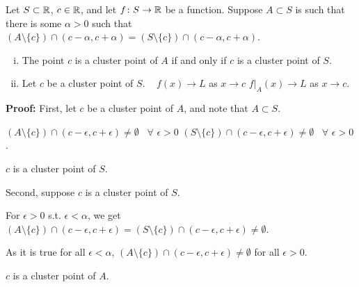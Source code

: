 \documentclass[10pt,aspectratio=169]{beamer}
\begin{document}
\begin{frame}

\begin{proposition}
Let $S \subset {\mathbb{R}}$, $c \in {\mathbb{R}}$, and
let $f \colon S
\to {\mathbb{R}}$ be a function.
\pause
Suppose
$A \subset S$ is such that there is some $\alpha > 0$ such that
$(A \setminus \{ c \}) \cap (c-\alpha,c+\alpha) = (S \setminus \{ c \}) \cap (c-\alpha,c+\alpha)$.
\pause
\begin{enumerate}[(i)]
\item
The point $c$ is a cluster point of $A$ if and only if $c$ is a cluster point
of $S$.
\item\pause
Let $c$ be a cluster point of $S$. ~ $f(x) \to L$ as $x \to c$
\wiffif
$f|_A(x) \to L$ as $x \to c$.
\end{enumerate}
\end{proposition}

\pause
\textbf{Proof:}
First, let $c$ be a cluster point of $A$, and note that $A \subset S$.

\pause
$( A \setminus \{ c\} ) \cap (c-\epsilon,c+\epsilon) \not= \emptyset$
~$\forall$ $\epsilon > 0$
\pause
\wthus
$( S \setminus \{ c\} ) \cap
(c-\epsilon,c+\epsilon) \not= \emptyset$
~$\forall$ $\epsilon > 0$.

\pause
\thus \quad $c$ is a cluster point of $S$.

\pause
\medskip

Second, suppose $c$ is a cluster point of $S$.

\pause
For $\epsilon > 0$ s.t.  $\epsilon < \alpha$, we get $( A \setminus \{ c\} ) \cap (c-\epsilon,c+\epsilon) =
( S \setminus \{ c\} ) \cap (c-\epsilon,c+\epsilon) \not= \emptyset$.

\pause
As it is true for all $\epsilon < \alpha$,
\quad
$( A \setminus \{ c\} ) \cap (c-\epsilon,c+\epsilon) \not=\emptyset$ for all
$\epsilon > 0$.

\pause
\thus \quad $c$ is a cluster point of $A$.

\end{frame}
\end{document}
